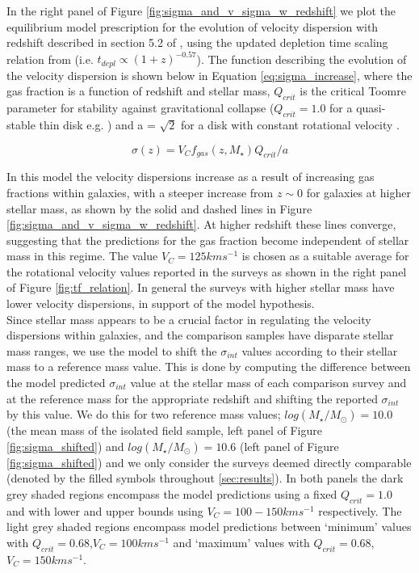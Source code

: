 \documentclass[fleqn,usenatbib]{mn2e}
\begin{document}
In the right panel of Figure \ref{fig:sigma_and_v_sigma_w_redshift} we plot the equilibrium model prescription for the evolution of velocity dispersion with redshift described in section 5.2 of \cite{Wisnioski2015}, using the updated depletion time scaling relation from \cite{Tacconi2017} (i.e. $t_{depl} \propto (1 + z)^{-0.57}$).
The function describing the evolution of the velocity dispersion is shown below in Equation \ref{eq:sigma_increase}, where the gas fraction is a function of redshift and stellar mass, $Q_{crit}$ is the critical Toomre parameter for stability against gravitational collapse \citep{Toomre1964} ($Q_{crit} = 1.0$ for a quasi-stable thin disk e.g. \citealt{ForsterSchreiber2006,Burkert2010,Genzel2011,Wisnioski2015}) and a = $\sqrt{2}$ for a disk with constant rotational velocity \citep{Wisnioski2015}. 

\begin{equation}\label{eq:sigma_increase}
    \sigma(z) = V_{C}f_{gas}(z,M_{\star})Q_{crit}/a
\end{equation}

In this model the velocity dispersions increase as a result of increasing gas fractions within galaxies, with a steeper increase from $z\sim0$ for galaxies at higher stellar mass, as shown by the solid and dashed lines in Figure \ref{fig:sigma_and_v_sigma_w_redshift}.
At higher redshift these lines converge, suggesting that the predictions for the gas fraction become independent of stellar mass in this regime.
The value $V_{C}=125kms^{-1}$ is chosen as a suitable average for the rotational velocity values reported in the surveys as shown in the right panel of Figure \ref{fig:tf_relation}.
In general the surveys with higher stellar mass have lower velocity dispersions, in support of the model hypothesis. \\

Since stellar mass appears to be a crucial factor in regulating the velocity dispersions within galaxies, and the comparison samples have disparate stellar mass ranges, we use the model to shift the $\sigma_{int}$ values according to their stellar mass to a reference mass value.
This is done by computing the difference between the model predicted $\sigma_{int}$ value at the stellar mass of each comparison survey and at the reference mass for the appropriate redshift and shifting the reported $\sigma_{int}$ by this value.
We do this for two reference mass values; $log(M_{\star}/M_{\odot}) = 10.0$ (the mean mass of the isolated field sample, left panel of Figure \ref{fig:sigma_shifted}) and $log(M_{\star}/M_{\odot}) = 10.6$ (left panel of Figure \ref{fig:sigma_shifted}) and we only consider the surveys deemed directly comparable (denoted by the filled symbols throughout \cref{sec:results}).
In both panels the dark grey shaded regions encompass the model predictions using a fixed $Q_{crit} = 1.0$ and with lower and upper bounds using $V_{C} = 100-150kms^{-1}$ respectively.
The light grey shaded regions encompass model predictions between `minimum' values with $Q_{crit} = 0.68$,$V_{C}=100kms^{-1}$ and `maximum' values with $Q_{crit} = 0.68$,$V_{C}=150kms^{-1}$. \\
\end{document}
